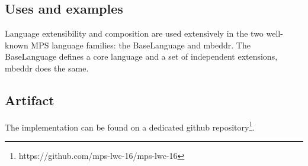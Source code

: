 \documentclass[preprint,numbers,10pt]{sigplanconf}
\newcommand\comment[1]{\textcolor{blue}{#1}}
\newcommand\ana[1]{\textcolor{red}{ANA: {#1}}}
\begin{document}
\subsection{Uses and examples}

Language extensibility and composition are used extensively in the two well-known MPS language families: the BaseLanguage and mbeddr. The BaseLanguage defines a core language and a set of independent extensions, mbeddr does the same.




%

\subsection{Artifact}
The implementation can be found on a dedicated github repository\footnote{https://github.com/mps-lwc-16/mps-lwc-16}.

%
%
\end{document}
